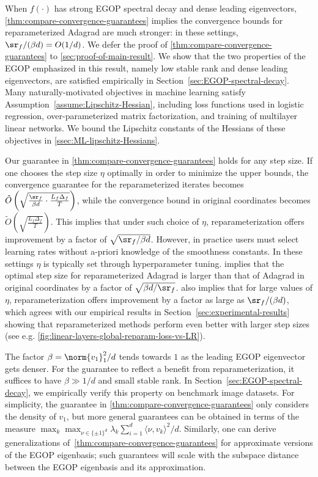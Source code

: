 \documentclass{article}
\begin{document}
When $f(\cdot)$ has strong EGOP spectral decay and dense leading eigenvectors, \cref{thm:compare-convergence-guarantees} implies the convergence bounds for reparameterized Adagrad are much stronger: in these settings, $\sr_f/(\beta d) = O(1/d)$. We defer the proof of \cref{thm:compare-convergence-guarantees} to \cref{sec:proof-of-main-result}. We show that the two properties of the EGOP emphasized in this result, namely low stable rank and dense leading eigenvectors, are satisfied empirically in Section~\ref{sec:EGOP-spectral-decay}. Many naturally-motivated objectives in machine learning satisfy Assumption~\ref{assume:Lipschitz-Hessian}, including loss functions used in logistic regression, over-parameterized matrix factorization, and training of multilayer linear networks. We bound the Lipschitz constants of the Hessians of these objectives in \cref{ssec:ML-lipschitz-Hessians}.

Our guarantee in \cref{thm:compare-convergence-guarantees} holds for any step size. If one chooses the step size $\eta$ optimally in order to minimize the upper bounds, the convergence guarantee for the reparameterized iterates becomes $\tilde{O}\left(\sqrt{\frac{\sr_f}{\beta d}\cdot \frac{L_f \Delta_f}{ T}}\right)$, while the convergence bound in original coordinates becomes $\tilde{O}\left(\sqrt{\frac{L_f \Delta_f}{T}}\right)$. This implies that under such choice of $\eta$, reparameterization offers improvement by a factor of $\sqrt{\sr_f/\beta d}$. However, in practice users must select learning rates without a-priori knowledge of the smoothness constants. In these settings $\eta$ is typically set through hyperparameter tuning.  implies that the optimal step size for reparameterized Adagrad is larger than that of Adagrad in original coordinates by a factor of $\sqrt{\beta d/\sr_f}$.  also implies that  for large values of $\eta$, reparameterization offers improvement by a factor as large as $\sr_f/(\beta d)$, which agrees with our empirical results in Section~\ref{sec:experimental-results} showing that reparameterized methods perform even better with larger step sizes (see e.g. \cref{fig:linear-layers-global-reparam-loss-vs-LR}). 

The factor $\beta = \norm{v_1}^2_1/d$ tends towards $1$ as the leading EGOP eigenvector gets denser. For the guarantee to reflect a benefit from reparameterization, it suffices to have $\beta \gg 1/d$ and small stable rank. In Section~\ref{sec:EGOP-spectral-decay}, we empirically verify this property on benchmark image datasets.
For simplicity, the guarantee in \cref{thm:compare-convergence-guarantees} only considers the density of $v_1$, but more general guarantees can be obtained in terms of the measure $\max_k \max_{\nu \in \{\pm 1\}^d}\lambda_k \sum_{i=1}^d \langle \nu, v_k\rangle^2/d$. Similarly, one can derive generalizations of~\cref{thm:compare-convergence-guarantees} for approximate versions of the EGOP eigenbasis; such guarantees will scale with the subspace distance between the EGOP eigenbasis and its approximation.
\end{document}
